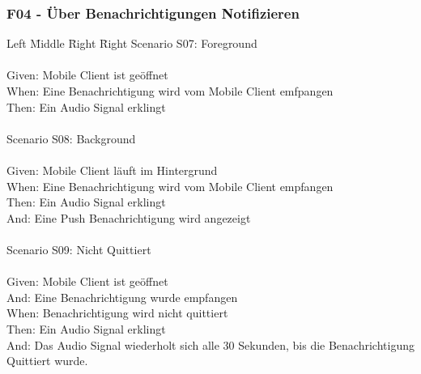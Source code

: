 \subsubsection*{F04 - Über Benachrichtigungen Notifizieren}
\begin{tabbing}
    Left \= Middle \= Right \= Right  \kill
    Scenario S07: \> \> \>  Foreground\\ \\
    Given: \> \> \>   Mobile Client ist geöffnet\\
    When: \> \> \>    Eine Benachrichtigung wird vom Mobile Client emfpangen\\
    Then: \> \> \>    Ein Audio Signal erklingt\\
    \\
    Scenario S08: \> \> \>  Background\\ \\
    Given: \> \> \>   Mobile Client läuft im Hintergrund\\
    When: \> \> \>    Eine Benachrichtigung wird vom Mobile Client empfangen\\
    Then: \> \> \>    Ein Audio Signal erklingt\\
    And: \> \> \>     Eine Push Benachrichtigung wird angezeigt\\
    \\
    Scenario S09: \> \> \>  Nicht Quittiert\\ \\
    Given: \> \> \>   Mobile Client ist geöffnet\\
    And: \> \> \>     Eine Benachrichtigung wurde empfangen\\
    When: \> \> \>    Benachrichtigung wird nicht quittiert\\
    Then: \> \> \>    Ein Audio Signal erklingt\\
    And: \> \> \>     Das Audio Signal wiederholt sich alle 30 Sekunden, bis die Benachrichtigung Quittiert wurde.\\
\end{tabbing}

\clearpage

